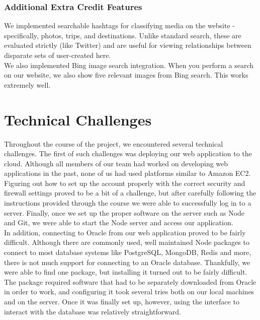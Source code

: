 \documentclass[11pt]{amsart}
\begin{document}
\subsubsection{Additional Extra Credit Features}
We implemented searchable hashtags for classifying media on the website - specifically, photos,
trips, and destinations. Unlike standard search, these are evaluated strictly (like Twitter)
and are useful for viewing relationships between disparate sets of user-created here. \\

We also implemented Bing image search integration. When you perform a search on our website,
we also show five relevant images from Bing search. This works extremely well.

\section{Technical Challenges}
Throughout the course of the project, we encountered several technical challenges. The first of such 
challenges was deploying our web application to the cloud. Although all members of our team had 
worked on developing web applications in the past, none of us had used platforms similar to Amazon EC2.
Figuring out how to set up the account properly with the correct security and firewall settings proved
to be a bit of a challenge, but after carefully following the instructions provided through the course
we were able to successfully log in to a server. Finally, once we set up the proper software on the server
such as Node and Git, we were able to start the Node server and access our application.\\

In addition, connecting to Oracle from our web application proved to be fairly difficult. Although there are
commonly used, well maintained Node packages to connect to most database systems like PostgreSQL, MongoDB,
Redis and more, there is not much support for connecting to an Oracle database. Thankfully, we were able to find
one package, but installing it turned out to be fairly difficult. The package required software that had to be
separately downloaded from Oracle in order to work, and configuring it took several tries both on our local machines
and on the server. Once it was finally set up, however, using the interface to interact with the database was
relatively straightforward.\\
\end{document}
